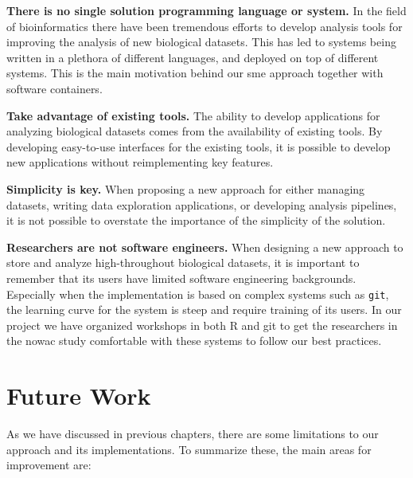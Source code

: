 \textbf{There is no single solution programming language or system.} 
In the field of bioinformatics there have been tremendous efforts to develop
analysis tools for improving the analysis of new biological datasets.  This has
led to systems being written in a plethora of different languages, and deployed
on top of different systems. This is the main motivation behind our \gls{sme}
approach together with software containers.

\textbf{Take advantage of existing tools.} The ability to develop applications
for analyzing biological datasets comes from the availability of existing tools.
By developing easy-to-use interfaces for the existing tools, it is possible
to develop new applications without reimplementing key features. 

\textbf{Simplicity is key.} When proposing a new approach for either managing
datasets, writing data exploration applications, or developing analysis
pipelines, it is not possible to overstate the importance of the simplicity of
the solution. 

\textbf{Researchers are not software engineers.} 
When designing a new approach to store and analyze high-throughout biological
datasets, it is important to remember that its users have limited software
engineering backgrounds. Especially when the implementation is based on complex
systems such as \texttt{git}, the learning curve for the system is steep and
require training of its users. In our project we have organized workshops in
both R and git to get the researchers in the \gls{nowac} study comfortable with
these systems to follow our best practices. 



\section{Future Work}
As we have discussed in previous chapters, there are some limitations to our
approach and its implementations. To summarize these, the main areas for
improvement are: 


